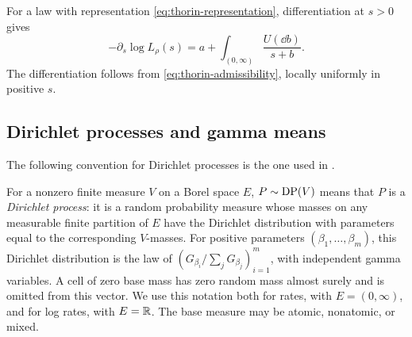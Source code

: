 For a law with representation \eqref{eq:thorin-representation}, differentiation at \(s>0\) gives
\begin{equation}\label{eq:ggc-log-derivative}
  -\partial_s\log L_\rho(s)
  =a+\int_{(0,\infty)}\frac{U(\dd b)}{s+b}.
\end{equation}
The differentiation follows from \eqref{eq:thorin-admissibility}, locally uniformly in positive \(s\).

\subsection{Dirichlet processes and gamma means}

The following convention for Dirichlet processes is the one used in \cite[Section~1, reprint p.~2]{James2005}.

\begin{definition}
\label{def:dirichlet-process}
For a nonzero finite measure \(V\) on a Borel space \(E\), \(P\sim\operatorname{DP}(V)\) means that \(P\) is a \emph{Dirichlet process}: it is a random probability measure whose masses on any measurable finite partition of \(E\) have the Dirichlet distribution with parameters equal to the corresponding \(V\)-masses.
For positive parameters \((\beta_1,\ldots,\beta_m)\), this Dirichlet distribution is the law of \((G_{\beta_i}/\sum_jG_{\beta_j})_{i=1}^m\), with independent gamma variables.
A cell of zero base mass has zero random mass almost surely and is omitted from this vector.
We use this notation both for rates, with \(E=(0,\infty)\), and for log rates, with \(E=\mathbb R\).
The base measure may be atomic, nonatomic, or mixed.
\end{definition}

